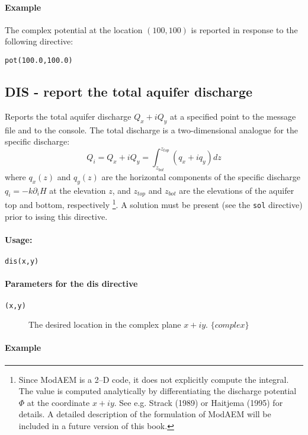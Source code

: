 \paragraph{Example}

The complex potential at the location $(100,100)$ is reported in
response to the following directive:
\begin{verbatim}
pot(100.0,100.0)
\end{verbatim}

\subsection{\label{DIS_directive}DIS - report the total aquifer discharge }

Reports the total aquifer discharge $Q_{x}+iQ_{y}$ at a specified
point to the message file and to the console. The total discharge
is a two-dimensional analogue for the specific discharge:
\[
Q_{i}=Q_{x}+iQ_{y}=\int_{z_{bot}}^{z_{top}}(q_{x}+iq_{y})dz
\]
 where $q_{x}(z)$ and $q_{y}(z)$ are the horizontal components of
the specific discharge $q_{i}=-k\partial_{i}H$ at the elevation $z$,
and $z_{top}$ and $z_{bot}$ are the elevations of the aquifer top
and bottom, respectively%
\footnote{Since ModAEM is a 2--D code, it does not explicitly compute the integral.
The value is computed analytically by differentiating the discharge
potential $\Phi$ at the coordinate $x+iy$. See e.g. Strack (1989)
or Haitjema (1995) for details. A detailed description of the formulation
of ModAEM will be included in a future version of this book.%
}. A solution must be present (see the \texttt{sol} directive) prior
to issing this directive. 


\paragraph{Usage:}
\begin{verbatim}
dis(x,y)
\end{verbatim}

\paragraph{Parameters for the \textsf{dis} directive }
\begin{description}
\item [{\texttt{(x,y)}}] The desired location in the complex plane $x+iy$.
$\{complex\}$
\end{description}

\paragraph{Example}

